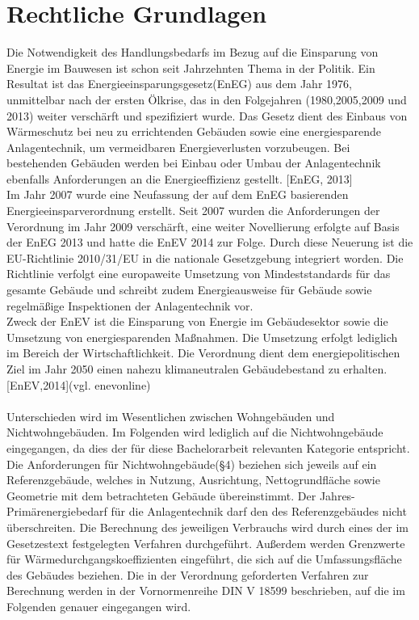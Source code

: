 \chapter{Rechtliche Grundlagen}
\label{cha:Rechtliche Grundlagen}

Die Notwendigkeit des Handlungsbedarfs im Bezug auf die Einsparung von Energie im Bauwesen ist schon seit Jahrzehnten Thema in der Politik. Ein Resultat ist das Energieeinsparungsgesetz(EnEG) aus dem Jahr 1976, unmittelbar nach der ersten Ölkrise, das in den Folgejahren (1980,2005,2009 und 2013) weiter verschärft und spezifiziert wurde. Das Gesetz dient des Einbaus von Wärmeschutz bei neu zu errichtenden Gebäuden sowie eine energiesparende Anlagentechnik, um vermeidbaren Energieverlusten vorzubeugen. Bei bestehenden Gebäuden werden bei Einbau oder Umbau der Anlagentechnik ebenfalls Anforderungen an die Energieeffizienz gestellt. [EnEG, 2013]  \\
Im Jahr 2007 wurde eine Neufassung der auf dem EnEG basierenden Energieeinsparverordnung erstellt. Seit 2007 wurden die Anforderungen der Verordnung im Jahr 2009 verschärft, eine weiter Novellierung erfolgte auf Basis der EnEG 2013 und hatte die EnEV 2014 zur Folge. Durch diese Neuerung ist die EU-Richtlinie 2010/31/EU in die nationale Gesetzgebung integriert worden. Die Richtlinie verfolgt eine europaweite Umsetzung von Mindeststandards für das gesamte Gebäude und schreibt zudem Energieausweise für Gebäude sowie regelmäßige Inspektionen der Anlagentechnik vor.\\
Zweck der EnEV ist die Einsparung von Energie im Gebäudesektor sowie die Umsetzung von energiesparenden Maßnahmen. Die Umsetzung erfolgt lediglich im Bereich der Wirtschaftlichkeit. Die Verordnung dient dem energiepolitischen Ziel im Jahr 2050 einen nahezu klimaneutralen Gebäudebestand zu erhalten.[EnEV,2014](vgl. enevonline) \\
\\
Unterschieden wird im Wesentlichen zwischen Wohngebäuden und Nichtwohngebäuden. Im Folgenden wird lediglich auf die Nichtwohngebäude eingegangen, da dies der für diese Bachelorarbeit relevanten Kategorie entspricht.\\
Die Anforderungen für Nichtwohngebäude(§4) beziehen sich jeweils auf ein Referenzgebäude, welches in Nutzung, Ausrichtung, Nettogrundfläche sowie Geometrie mit dem betrachteten Gebäude übereinstimmt. Der Jahres-Primärenergiebedarf für die Anlagentechnik darf den des Referenzgebäudes nicht überschreiten. Die Berechnung des jeweiligen Verbrauchs wird durch eines der im Gesetzestext festgelegten Verfahren durchgeführt. Außerdem werden Grenzwerte für Wärmedurchgangskoeffizienten eingeführt, die sich auf die Umfassungsfläche des Gebäudes beziehen. Die in der Verordnung geforderten Verfahren zur Berechnung werden in der Vornormenreihe DIN V 18599 beschrieben, auf die im Folgenden genauer eingegangen wird.  \\
